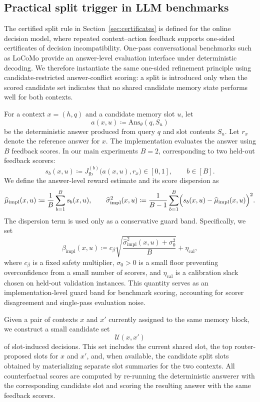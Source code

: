 \documentclass{article}
\theoremstyle{plain}
\theoremstyle{definition}
\theoremstyle{remark}
\begin{document}
\subsection{Practical split trigger in LLM benchmarks}
\label{app:practical-split-trigger}

The certified split rule in Section~\ref{sec:certificates} is defined for
the online decision model, where repeated context--action feedback supports
one-sided certificates of decision incompatibility. One-pass conversational
benchmarks such as LoCoMo provide an answer-level evaluation interface under
deterministic decoding. We therefore instantiate the same one-sided refinement
principle using candidate-restricted answer-conflict scoring: a split is
introduced only when the scored candidate set indicates that no shared candidate
memory state performs well for both contexts.

For a context \(x=(h,q)\) and a candidate memory slot \(u\), let
\[
a(x,u)
\coloneqq
\mathrm{Ans}_{\theta}(q,S_u)
\]
be the deterministic answer produced from query \(q\) and slot contents
\(S_u\). Let \(r_x\) denote the reference answer for \(x\). The
implementation evaluates the answer using \(B\) feedback scores. In our
main experiments \(B=2\), corresponding to two held-out feedback scorers:
\[
s_b(x,u)
\coloneqq
J_{\mathrm{fb}}^{(b)}\bigl(a(x,u),r_x\bigr)\in[0,1],
\qquad b\in[B].
\]
We define the answer-level reward estimate and its score dispersion as
\[
\widehat\mu_{\mathrm{impl}}(x,u)
\coloneqq
\frac{1}{B}\sum_{b=1}^{B}s_b(x,u),
\qquad
\widehat\sigma^2_{\mathrm{impl}}(x,u)
\coloneqq
\frac{1}{B-1}\sum_{b=1}^{B}
\Bigl(s_b(x,u)-\widehat\mu_{\mathrm{impl}}(x,u)\Bigr)^2 .
\]
The dispersion term is used only as a conservative guard band. Specifically,
we set
\[
\beta_{\mathrm{impl}}(x,u)
\coloneqq
c_{\beta}
\sqrt{\frac{\widehat\sigma^2_{\mathrm{impl}}(x,u)+\sigma_0^2}{B}}
+
\eta_{\mathrm{cal}},
\]
where \(c_{\beta}\) is a fixed safety multiplier, \(\sigma_0>0\) is a small
floor preventing overconfidence from a small number of scorers, and
\(\eta_{\mathrm{cal}}\) is a calibration slack chosen on held-out validation
instances. This quantity serves as an implementation-level guard band for benchmark
scoring, accounting for scorer disagreement and single-pass evaluation noise.

Given a pair of contexts \(x\) and \(x'\) currently assigned to the same
memory block, we construct a small candidate set
\[
\mathcal U(x,x')
\]
of slot-induced decisions. This set includes the current shared slot, the
top router-proposed slots for \(x\) and \(x'\), and, when available, the
candidate split slots obtained by materializing separate slot summaries for
the two contexts. All counterfactual scores are computed by re-running the
deterministic answerer with the corresponding candidate slot and scoring the
resulting answer with the same feedback scorers.
\end{document}
